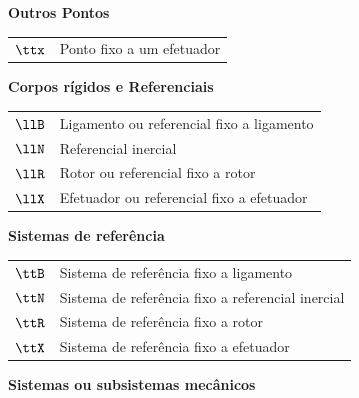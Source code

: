 \documentclass[]{politex}
\begin{document}
\begin{center} \begin{Large} \textbf{Outros Pontos} \end{Large} \end{center}
\begin{longtable}{lp{}}
  $\ttx$ & Ponto fixo a um efetuador \\
\end{longtable}
\begin{center} \begin{Large} \textbf{Corpos rígidos e Referenciais} \end{Large} \end{center}
\begin{longtable}{lp{}}
  $\llB$ & Ligamento ou referencial fixo a ligamento \\
  $\llN$ & Referencial inercial \\
  $\llR$ & Rotor ou referencial fixo a rotor \\
  $\llX$ & Efetuador ou referencial fixo a efetuador \\
\end{longtable}
\begin{center} \begin{Large} \textbf{Sistemas de referência} \end{Large} \end{center}
\begin{longtable}{lp{}}
  $\ttB$ & Sistema de referência fixo a ligamento \\
  $\ttN$ & Sistema de referência fixo a referencial inercial \\
  $\ttR$ & Sistema de referência fixo a rotor \\
  $\ttX$ & Sistema de referência fixo a efetuador \\
\end{longtable}
\begin{center} \begin{Large} \textbf{Sistemas ou subsistemas mecânicos} \end{Large} \end{center}
\end{document}
